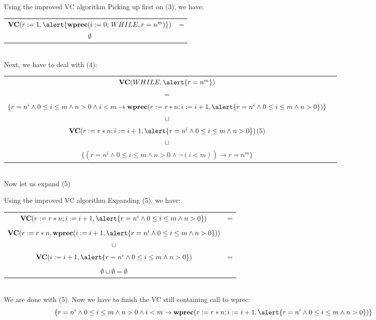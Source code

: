 \documentclass[aspectratio=169]{beamer}
\begin{document}
\begin{slide}{Using the improved VC algorithm}
Picking up first on (3), we have:\\\vspace{0.5cm}
\small{
\begin{tabular}{cc}
 $\textbf{VC}(r := 1,\alert{\textbf{wprec}(i := 0;\,WHILE,r = n^m)})$ & =\\
 $\emptyset$
\end{tabular}}\\\vspace{0.3cm}
Next, we have to deal with (4):\\\vspace{0.3cm}
\small{
\begin{tabular}{cc}
 $\textbf{VC}(WHILE,\alert{r = n^m})$ \\ =\\
 $\{r = n^i \land 0 \leq i \leq m \land n > 0 \land i < m \to \textbf{wprec}(r := r*n;i := i + 1, \alert{r = n^i \land 0 \leq i \leq m \land n > 0})\}$ \\
 $\cup$\\
 $\textbf{VC}(r := r*n;i := i + 1,\alert{r = n^i \land 0 \leq i \leq m \land n > 0})$\:(5)\\
 $\cup$\\
 $\{(r = n^i \land 0 \leq i \leq m \land n > 0 \land \neg(i < m)) \to r = n^m\}$
\end{tabular}}\\\vspace{0.3cm}
Now let us expand (5)
\end{slide}

\begin{slide}{Using the improved VC algorithm}
Expanding (5), we have:\\\vspace{0.5cm}
\small{
\begin{tabular}{cc}
 $\textbf{VC}(r := r*n;i := i + 1,\alert{r = n^i \land 0 \leq i \leq m \land n > 0})$ & =\\
 &\\
 $\textbf{VC}(r := r*n,\textbf{wprec}(i := i + 1,\alert{r = n^i \land 0 \leq i \leq m \land n > 0}))$\\
 $\cup$\\
 $\textbf{VC}(i := i + 1,\alert{r = n^i \land 0 \leq i \leq m \land n > 0})$ & =\\
 &\\
 $\emptyset \cup \emptyset = \emptyset$\\
\end{tabular}}\\\vspace{0.2cm}
We are done with (5). Now we have to finish the VC still containing call to wprec:\\\vspace{0.2cm}
$$\{r = n^i \land 0 \leq i \leq m \land n > 0 \land i < m \to \textbf{wprec}(r := r*n;i := i + 1, \alert{r = n^i \land 0 \leq i \leq m \land n > 0})\}$$
\end{slide}
\end{document}
